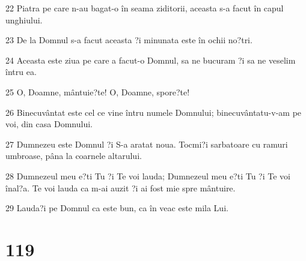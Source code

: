 \par 22 Piatra pe care n-au bagat-o în seama ziditorii, aceasta s-a facut în capul unghiului.
\par 23 De la Domnul s-a facut aceasta ?i minunata este în ochii no?tri.
\par 24 Aceasta este ziua pe care a facut-o Domnul, sa ne bucuram ?i sa ne veselim întru ea.
\par 25 O, Doamne, mântuie?te! O, Doamne, spore?te!
\par 26 Binecuvântat este cel ce vine întru numele Domnului; binecuvântatu-v-am pe voi, din casa Domnului.
\par 27 Dumnezeu este Domnul ?i S-a aratat noua. Tocmi?i sarbatoare cu ramuri umbroase, pâna la coarnele altarului.
\par 28 Dumnezeul meu e?ti Tu ?i Te voi lauda; Dumnezeul meu e?ti Tu ?i Te voi înal?a. Te voi lauda ca m-ai auzit ?i ai fost mie spre mântuire.
\par 29 Lauda?i pe Domnul ca este bun, ca în veac este mila Lui.

\chapter{119}


